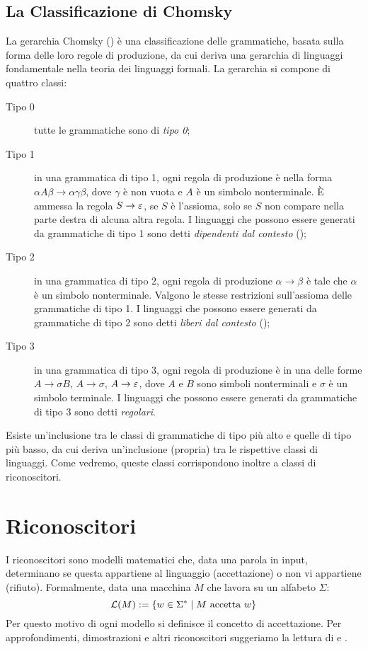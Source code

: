 \subsection{La Classificazione di Chomsky}\label{subs:prel:chom}
La gerarchia Chomsky (\cite{Chomsky:56:hier}) è una classificazione delle grammatiche, basata sulla forma delle loro regole di produzione, da cui deriva una gerarchia di linguaggi fondamentale nella teoria dei linguaggi formali. La gerarchia si compone di quattro classi:
\begin{description}
	\item[Tipo 0] tutte le grammatiche sono di \emph{tipo 0};
	\item[Tipo 1] in una grammatica di tipo 1, ogni regola di produzione è nella forma $\alpha A\beta\to\alpha\gamma\beta$, dove $\gamma$ è non vuota e $A$ è un simbolo nonterminale. È ammessa la regola $S\to\varepsilon$, se $S$ è l'assioma, solo se $S$ non compare nella parte destra di alcuna altra regola. I linguaggi che possono essere generati da grammatiche di tipo 1 sono detti \emph{dipendenti dal contesto} ();
	\item[Tipo 2] in una grammatica di tipo 2, ogni regola di produzione $\alpha\to\beta$ è tale che $\alpha$ è un simbolo nonterminale. Valgono le stesse restrizioni sull'assioma delle grammatiche di tipo 1. I linguaggi che possono essere generati da grammatiche di tipo 2 sono detti \emph{liberi dal contesto} ();
	\item[Tipo 3] in una grammatica di tipo 3, ogni regola di produzione è in una delle forme $A\to\sigma B$, $A\to\sigma$, $A\to\varepsilon$, dove $A$ e $B$ sono simboli nonterminali e $\sigma$ è un simbolo terminale. I linguaggi che possono essere generati da grammatiche di tipo 3 sono detti \emph{regolari}.
\end{description}
Esiste un'inclusione tra le classi di grammatiche di tipo più alto e quelle di tipo più basso, da cui deriva un'inclusione (propria) tra le rispettive classi di linguaggi. Come vedremo, queste classi corrispondono inoltre a classi di riconoscitori.



\section{Riconoscitori}
I riconoscitori sono modelli matematici che, data una parola in input, determinano se questa appartiene al linguaggio (accettazione) o non vi appartiene (rifiuto). Formalmente, data una macchina $M$ che lavora su un alfabeto $\Sigma$:
\begin{equation*}
	\mathcal L(M) := \left\{ w\in\Sigma^*\mid M\text{ accetta }w \right\}
\end{equation*}
Per questo motivo di ogni modello si definisce il concetto di accettazione.
Per approfondimenti, dimostrazioni e altri riconoscitori suggeriamo la lettura di \cite{Hopcroft:79:introLFA} e \cite{Shallit:09:secondLFA}.


